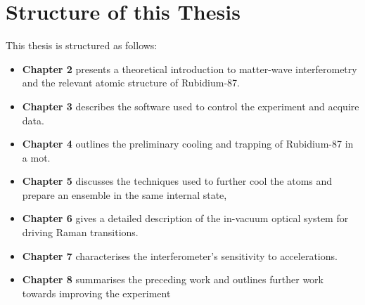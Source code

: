 \section{Structure of this Thesis}
This thesis is structured as follows:
\begin{itemize}
  \item \textbf{Chapter 2} presents a theoretical introduction to
    matter-wave interferometry and the relevant atomic structure of
    Rubidium-87.
  \item \textbf{Chapter 3} describes the software used to control the
    experiment and acquire data.
  \item \textbf{Chapter 4} outlines the preliminary cooling and
    trapping of Rubidium-87 in a \ac{mot}.
  \item \textbf{Chapter 5} discusses the techniques used to further
    cool the atoms and prepare an ensemble in the same internal state,
  \item \textbf{Chapter 6} gives a detailed description of the
    in-vacuum optical system for driving Raman transitions.
  \item \textbf{Chapter 7} characterises the interferometer's
    sensitivity to accelerations.
  \item \textbf{Chapter 8} summarises the preceding work and outlines
    further work towards improving the experiment
\end{itemize}



